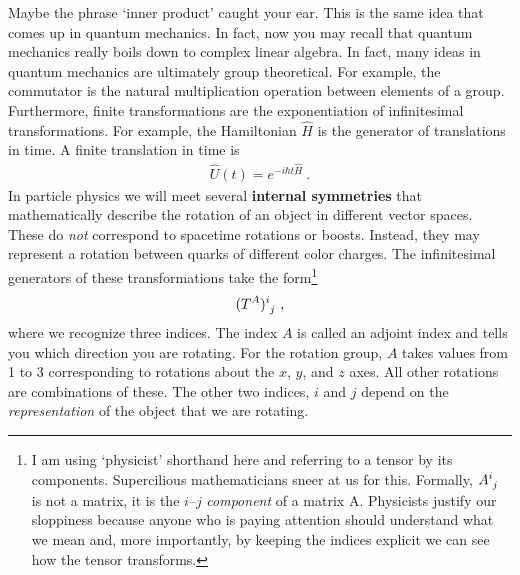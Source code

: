 \documentclass[12pt, oneside]{report}    %
\begin{document}
Maybe the phrase `inner product' caught your ear. This is the same idea that comes up in quantum mechanics. In fact, now you may recall that quantum mechanics really boils down to complex linear algebra. In fact, many ideas in quantum mechanics are ultimately group theoretical. For example, the commutator is the natural multiplication operation between elements of a group. Furthermore, finite transformations are the exponentiation of infinitesimal transformations. For example, the Hamiltonian $\hat H$ is the generator of translations in time. A finite translation in time is
\begin{align}
    \hat U(t) = e^{-i \hbar t\hat H} \ .
    \label{eq:Ut:time:H}
\end{align}
In particle physics we will meet several \textbf{internal symmetries} that mathematically describe the rotation of an object in different vector spaces. These do \emph{not} correspond to spacetime rotations or boosts. Instead, they may represent a rotation between quarks of different color charges. The infinitesimal generators of these transformations take the form\footnote{I am using `physicist' shorthand here and referring to a tensor by its components. Supercilious mathematicians sneer at us for this. Formally, $A\aij{i}{j}$ is not a matrix, it is the $i$--$j$ \emph{component} of a matrix A. Physicists justify our sloppiness because anyone who is paying attention should understand what we mean and, more importantly, by keeping the indices explicit we can see how the tensor transforms.}
\begin{align}
(T^A)\aij{i}{j}\ ,    
\end{align}
where we recognize three indices. The index $A$ is called an adjoint index and tells you which direction you are rotating. For the rotation group, $A$ takes values from 1 to 3 corresponding to rotations about the $x$, $y$, and $z$ axes. All other rotations are combinations of these. The other two indices, $i$ and $j$ depend on the \emph{representation} of the object that we are rotating. 
\end{document}
